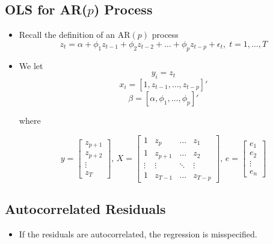 \documentclass[11pt]{article}
\begin{document}
\subsection{OLS for AR($p$) Process}
\begin{itemize}
    \item Recall the definition of an $\text{AR}(p)$ process 
    \[z_t = \alpha + \phi_1 z_{t-1} + \phi_2 z_{t-2} + \hdots + \phi_p z_{t-p} + \epsilon_t , 
    \; t = 1, \ldots, T\]
    \item We let 
    \[y_i = z_t\]
    \[x_i= [1, z_{t-1}, \ldots, z_{t-p}]'\]
    \[\beta = [\alpha, \phi_1, \ldots, \phi_p]'\]

    where 

    \[
    y = \begin{bmatrix}
        z_{p+1} \\
        z_{p+2} \\
        \vdots \\
        z_T
    \end{bmatrix}, \,
    X = \begin{bmatrix}
        1 & z_p & \hdots & z_1 \\
        1 & z_{p+1} & \hdots & z_2 \\
        \vdots & \vdots & \ddots & \vdots \\
        1 & z_{T-1} & \hdots & z_{T-p}
    \end{bmatrix}, \, 
    e = \begin{bmatrix}
        e_1 \\
        e_2 \\
        \vdots \\
        e_n
    \end{bmatrix}
    \]
\end{itemize}

\subsection{Autocorrelated Residuals}
\begin{itemize}
    \item If the residuals are autocorrelated, the regression is misspecified. 
\end{itemize}
\end{document}
